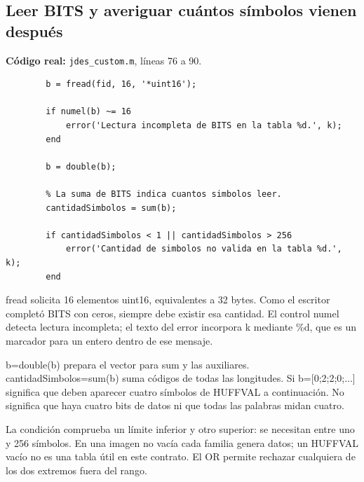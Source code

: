 \documentclass[11pt,a4paper,oneside]{report}
\begin{document}
\par\medskip\noindent\begin{minipage}{\linewidth}

\subsection{Leer BITS y averiguar cuántos símbolos vienen después}

\textbf{Código real:} \texttt{jdes\_custom.m}, líneas 76 a 90.

\begin{lstlisting}[firstnumber=76]
        % Cada BITS contiene 16 valores uint16.
        b = fread(fid, 16, '*uint16');

        if numel(b) ~= 16
            error('Lectura incompleta de BITS en la tabla %d.', k);
        end

        b = double(b);

        % La suma de BITS indica cuantos simbolos leer.
        cantidadSimbolos = sum(b);

        if cantidadSimbolos < 1 || cantidadSimbolos > 256
            error('Cantidad de simbolos no valida en la tabla %d.', k);
        end
\end{lstlisting}

\end{minipage}\par


fread solicita 16 elementos uint16, equivalentes a 32 bytes. Como el escritor
completó BITS con ceros, siempre debe existir esa cantidad. El control numel
detecta lectura incompleta; el texto del error incorpora k mediante \%d,
que es un marcador para un entero dentro de ese mensaje.

b=double(b) prepara el vector para sum y las auxiliares. cantidadSimbolos=sum(b)
suma códigos de todas las longitudes. Si b=[0;2;2;0;...] significa que deben
aparecer cuatro símbolos de HUFFVAL a continuación. No significa que haya
cuatro bits de datos ni que todas las palabras midan cuatro.

La condición comprueba un límite inferior y otro superior: se necesitan
entre uno y 256 símbolos. En una imagen no vacía cada familia genera datos;
un HUFFVAL vacío no es una tabla útil en este contrato. El OR permite rechazar
cualquiera de los dos extremos fuera del rango.
\end{document}
